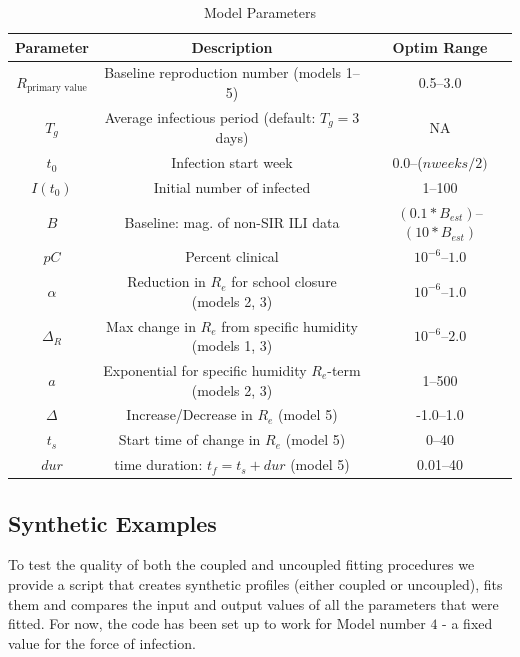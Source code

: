 \documentclass[a4paper]{article}
\begin{document}
\begin{table}[h]
  \caption{ Model Parameters}
  \centering
  \begin{tabular}{|c|c|c|}
    \hline
    Parameter & Description & Optim Range \\ \hline
    $R_\text{primary value}$ & Baseline reproduction number (models 1--5) & 0.5--3.0  \\ \hline
    $T_g$ & Average infectious period (default: $T_g=3$ days) & NA \\ \hline
    $t_0$ & Infection start week & 0.0--($nweeks/2)$ \\ \hline
    $I(t_0)$ & Initial number of infected & 1--100 \\ \hline
    $B$ & Baseline: mag. of non-SIR ILI data & $(0.1*B_{est})$--$(10*B_{est})$ \\ \hline
    $pC$ & Percent clinical & $10^{-6}$--$1.0$ \\ \hline
    $\alpha$ & Reduction in $R_e$ for school closure (models 2, 3) & $10^{-6}$--$1.0$ \\ \hline
    $\Delta_R$ & Max change in $R_e$ from specific humidity (models 1, 3) & $10^{-6}$--$2.0$ \\ \hline
    $a$ & Exponential for specific humidity $R_e$-term (models 2, 3) & 1--500 \\ \hline
    $\Delta$ & Increase/Decrease in $R_e$ (model 5) & -1.0--1.0 \\ \hline
    $t_s$ & Start time of change in $R_e$ (model 5) & 0--40 \\ \hline
    $dur$ & time duration: $t_f=t_s+dur$ (model 5)& 0.01--40 \\ \hline
  \end{tabular} \label{tab:param}
\end{table}

\subsection{Synthetic Examples}
To test the quality of both the coupled and uncoupled fitting procedures we provide a script that creates synthetic profiles (either coupled or uncoupled), fits them and compares the input and output values of all the parameters that were fitted.  For now, the code has been set up to work for Model number $4$ - a fixed value for the force of infection.
\end{document}
